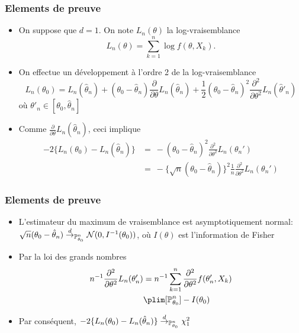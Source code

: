 \begin{frame}
\frametitle{Elements de preuve}
\begin{itemize}
\item On suppose que $d=1$. On note $L_n(\theta)$ la log-vraisemblance
\[
L_n(\theta)= \sum_{k=1}^n \log f(\theta,X_k).
\]
\item On effectue un développement à l'ordre 2 de la log-vraisemblance
\[
L_n(\theta_0)=L_n(\hat{\theta}_{n})+(\theta_{0}-\hat{\theta}_{n})\frac{\partial}{\partial\theta}L_n(\hat{\theta}_n)+
\frac{1}{2}(\theta_{0}-\hat{\theta}_{n})^{2}\frac{\partial^{2}}{\partial\theta^{2}}L_n(\hat{\theta}'_n)
\]
où $\theta'_n \in [\theta_0,\hat{\theta}_n]$
\item Comme $\frac{\partial}{\partial\theta}L_n(\hat{\theta}_n)$, ceci implique
\begin{align*}
-2 \{ L_n(\theta_{0})-L_n(\hat{\theta}_{n}) \}
&=\ -(\theta_{0}-\hat{\theta}_{n})^{2}\frac{\partial^{2}}{\partial\theta^{2}}L_n(\theta_{n}') \\
&=\ - \{\sqrt{n} (\theta_{0}-\hat{\theta}_{n})\}^{2} \frac{1}{n} \frac{\partial^{2}}{\partial\theta^{2}}L_n(\theta_{n}')
\end{align*}
\end{itemize}
\end{frame}

\begin{frame}
\frametitle{Elements de preuve}
\begin{itemize}
\item L'estimateur du maximum de vraisemblance est asymptotiquement normal: $\sqrt{n} (\theta_{0}-\hat{\theta}_{n}) \stackrel{d}{\rightarrow}_{\operatorname{{\mathbb P}}_{\theta_0}^n} \mathcal{N}(0,I^{-1}(\theta_0))$, où $I(\theta)$ est l'information de Fisher
\item Par la loi des grands nombres
\begin{align*}
n^{-1} \frac{\partial^{2}}{\partial\theta^{2}}L_n(\theta_{n}')
&= n^{-1} \sum_{k=1}^n \frac{\partial^{2}}{\partial\theta^{2}} f(\theta'_n,X_k)\\
&\plim[\PP_{\theta_0}^n] -I(\theta_0)
\end{align*}
\item Par conséquent, $-2 \{ L_n(\theta_{0})-L_n(\hat{\theta}_{n}) \} \stackrel{d}{\rightarrow}_{\operatorname{{\mathbb P}}_{\theta_0}^n}  \chi^2_1$
\end{itemize}
\end{frame}





